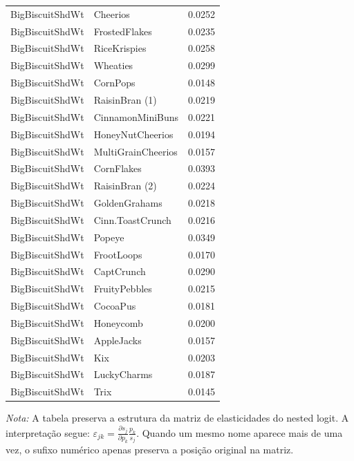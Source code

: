 \begin{table}[H]
\begin{tabular}{llr}
BigBiscuitShdWt & Cheerios & 0.0252 \\
BigBiscuitShdWt & FrostedFlakes & 0.0235 \\
BigBiscuitShdWt & RiceKrispies & 0.0258 \\
BigBiscuitShdWt & Wheaties & 0.0299 \\
BigBiscuitShdWt & CornPops & 0.0148 \\
BigBiscuitShdWt & RaisinBran (1) & 0.0219 \\
BigBiscuitShdWt & CinnamonMiniBuns & 0.0221 \\
BigBiscuitShdWt & HoneyNutCheerios & 0.0194 \\
BigBiscuitShdWt & MultiGrainCheerios & 0.0157 \\
BigBiscuitShdWt & CornFlakes & 0.0393 \\
BigBiscuitShdWt & RaisinBran (2) & 0.0224 \\
BigBiscuitShdWt & GoldenGrahams & 0.0218 \\
BigBiscuitShdWt & Cinn.ToastCrunch & 0.0216 \\
BigBiscuitShdWt & Popeye & 0.0349 \\
BigBiscuitShdWt & FrootLoops & 0.0170 \\
BigBiscuitShdWt & CaptCrunch & 0.0290 \\
BigBiscuitShdWt & FruityPebbles & 0.0215 \\
BigBiscuitShdWt & CocoaPus & 0.0181 \\
BigBiscuitShdWt & Honeycomb & 0.0200 \\
BigBiscuitShdWt & AppleJacks & 0.0157 \\
BigBiscuitShdWt & Kix & 0.0203 \\
BigBiscuitShdWt & LuckyCharms & 0.0187 \\
BigBiscuitShdWt & Trix & 0.0145 \\
\bottomrule
\end{tabular}

\vspace{0.3em}
\footnotesize
\textit{Nota:} A tabela preserva a estrutura da matriz de elasticidades do nested logit. A interpretação segue: $\varepsilon_{jk}=\frac{\partial s_j}{\partial p_k}\frac{p_k}{s_j}$. Quando um mesmo nome aparece mais de uma vez, o sufixo numérico apenas preserva a posição original na matriz.
\end{table}
\endgroup


